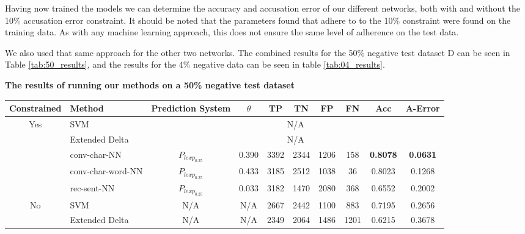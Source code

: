 Having now trained the models we can determine the accuracy and accusation error
of our different networks, both with and without the 10\% accusation error
constraint. It should be noted that the parameters found that adhere to to the
10\% constraint were found on the training data. As with any machine learning
approach, this does not ensure the same level of adherence on the test data.

We also used that same approach for the other two networks. The combined
results for the 50\% negative test dataset \gls{D} can be seen in Table
\ref{tab:50_results}, and the results for the 4\% negative data can be seen in
table \ref{tab:04_results}.

\begin{table}[]
\centering
\textbf{The results of running our methods on a 50\% negative test dataset}\par\medskip
\begin{adjustbox}{center}
\begin{tabular}{|c|l|c|c|c|c|c|c|c|c|}
\hline
Constrained                & Method                  & Prediction System            & $\theta$ & TP  & TN  & FP  & FN  & Acc             & A-Error         \\ \hline
\multirow{5}{*}{Yes} & SVM                     & \multicolumn{8}{c|}{N/A}                                                                     \\ \cline{2-10} 
                     & Extended Delta          & \multicolumn{8}{c|}{N/A}                                                                     \\ \cline{2-10} 
                     & \gls{conv-char-NN}      & $P_{lexp_{0.25}}$ & 0.390    & 3392 & 2344 & 1206 & 158  & \textbf{0.8078} & \textbf{0.0631} \\ \cline{2-10} 
                     & \gls{conv-char-word-NN} & $P_{lexp_{0.25}}$ & 0.433    & 3185 & 2512 & 1038 & 36   & 0.8023          & 0.1268          \\ \cline{2-10} 
                     & \gls{rec-sent-NN}       & $P_{lexp_{0.25}}$ & 0.033    & 3182 & 1470 & 2080 & 368  & 0.6552          & 0.2002          \\ \hline\hline
\multirow{5}{*}{No}  & SVM                     & N/A               & N/A      & 2667 & 2442 & 1100 & 883  & 0.7195          & 0.2656          \\ \cline{2-10} 
                     & Extended Delta          & N/A               & N/A      & 2349 & 2064 & 1486 & 1201 & 0.6215          & 0.3678          \\ \cline{2-10} 

\end{tabular}
\end{adjustbox}
\end{table}
